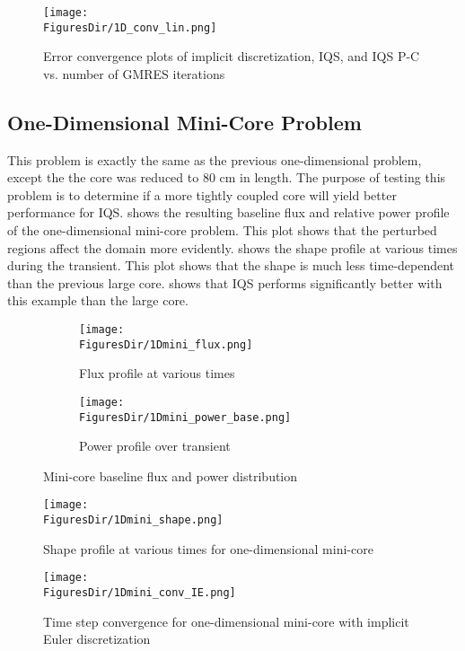 \begin{figure}[!htbp]
\begin{center}
\texttt{[image: \\FiguresDir/1D\_conv\_lin.png]}
\caption{Error convergence plots of implicit discretization, IQS, and IQS P-C vs. number of GMRES iterations}
\label{fig:1D_conv_lin}
\end{center}
\end{figure}


\subsection{One-Dimensional Mini-Core Problem}

This problem is exactly the same as the previous one-dimensional problem, except the the core was reduced to 80 cm in length. The purpose of testing this problem is to determine if a more tightly coupled core will yield better performance for IQS.  shows the resulting baseline flux and relative power profile of the one-dimensional mini-core problem. This plot shows that the perturbed regions affect the domain more evidently.  shows the shape profile at various times during the transient. This plot shows that the shape is much less time-dependent than the previous large core.  shows that IQS performs significantly better with this example than the large core.

\begin{figure}[!htbp]
\centering
\begin{subfigure}[b]{0.49\textwidth}
\centering
\texttt{[image: \\FiguresDir/1Dmini\_flux.png]}
\caption{Flux profile at various times}
\end{subfigure}
\begin{subfigure}[b]{0.49\textwidth}
\centering
\texttt{[image: \\FiguresDir/1Dmini\_power\_base.png]}
\caption{Power profile over transient}
\end{subfigure}
\caption{Mini-core baseline flux and power distribution}
\label{fig:1Dmini_flux}
\end{figure}

\begin{figure}[!htbp]
\centering
\texttt{[image: \\FiguresDir/1Dmini\_shape.png]}
\caption{Shape profile at various times for one-dimensional mini-core}
\label{fig:1Dmini_shape}
\end{figure}

\begin{figure}[!htbp]
\centering
\texttt{[image: \\FiguresDir/1Dmini\_conv\_IE.png]}
\caption{Time step convergence for one-dimensional mini-core with implicit Euler discretization}
\label{fig:1Dmini_conv}
\end{figure}

